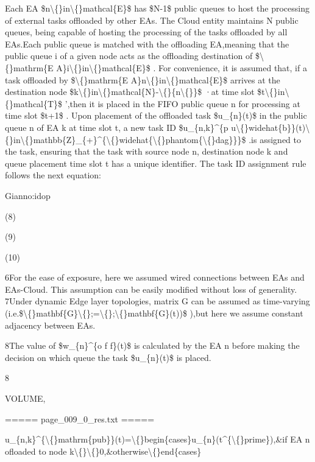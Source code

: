 \documentclass{article}
\begin{document}
Each EA \$n\textbackslash\{\}in\textbackslash\{\}mathcal\{E\}\$ has \$N-1\$ public queues to host the processing of external tasks offloaded by other EAs. The Cloud entity maintains N public queues, being capable of hosting the processing of the tasks offloaded by all EAs.Each public queue is matched with the offloading EA,meaning that the public queue i of a given node acts as the offloading destination of \$\textbackslash\{\}mathrm\{E A\}i\textbackslash\{\}in\textbackslash\{\}mathcal\{E\}\$ . For convenience, it is assumed that, if a task offloaded by \$\textbackslash\{\}mathrm\{E A\}n\textbackslash\{\}in\textbackslash\{\}mathcal\{E\}\$ arrives at the destination node \$k\textbackslash\{\}in\textbackslash\{\}mathcal\{N\}-\textbackslash\{\}\{n\textbackslash\{\}\}\$ ·at time slot \$t\textbackslash\{\}in\textbackslash\{\}mathcal\{T\}\$ ',then it is placed in the FIFO public queue n for processing at time slot \$t+1\$ . Upon placement of the offloaded task \$u\_\{n\}(t)\$ in the public queue n of EA k at time slot t, a new task ID \$u\_\{n,k\}\textasciicircum{}\{p u\textbackslash\{\}widehat\{b\}\}(t)\textbackslash\{\}in\textbackslash\{\}mathbb\{Z\}\_\{+\}\textasciicircum{}\{\textbackslash\{\}widehat\{\textbackslash\{\}phantom\{\textbackslash\{\}dag\}\}\}\$ .is assigned to the task, ensuring that the task with source node n, destination node k and queue placement time slot t has a unique identifier. The task ID assignment rule follows the next equation:

Gianno:idop

(8)

(9)

(10)

6For the ease of exposure, here we assumed wired connections between EAs and EAs-Cloud. This assumption can be easily modified without loss of generality.
7Under dynamic Edge layer topologies, matrix G can be assumed as time-varying (i.e.\$\textbackslash\{\}mathbf\{G\}\textbackslash\{\};=\textbackslash\{\};\textbackslash\{\}mathbf\{G\}(t))\$ ),but here we assume constant adjacency between EAs.

8The value of \$w\_\{n\}\textasciicircum{}\{o f f\}(t)\$ is calculated by the EA n before making the decision on which queue the task \$u\_\{n\}(t)\$ is placed.

8

VOLUME,

===== page\_009\_0\_res.txt =====


u\_\{n,k\}\textasciicircum{}\{\textbackslash\{\}mathrm\{pub\}\}(t)=\textbackslash\{\}begin\{cases\}u\_\{n\}(t\textasciicircum{}\{\textbackslash\{\}prime\}),\&if EA n ofloaded to node k\textbackslash\{\}\textbackslash\{\}0,\&otherwise\textbackslash\{\}end\{cases\}
\end{document}
